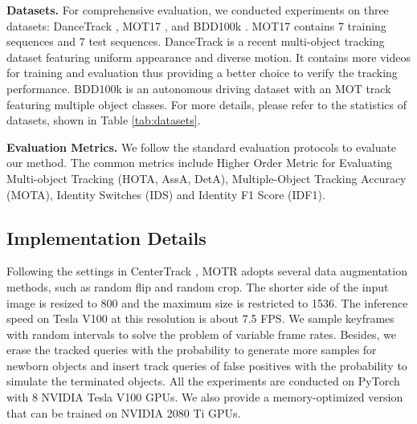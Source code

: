 \documentclass[runningheads]{llncs}
\begin{document}
\noindent \textbf{Datasets.}
For comprehensive evaluation, we conducted experiments on three datasets: DanceTrack \cite{peize2021dance}, MOT17 \cite{milan2016mot16}, and BDD100k \cite{bdd100k}.
MOT17 \cite{milan2016mot16} contains 7 training sequences and 7 test sequences.
DanceTrack \cite{peize2021dance} is a recent multi-object tracking dataset featuring uniform appearance and diverse motion. It contains more videos for training and evaluation thus providing a better choice to verify the tracking performance.
BDD100k \cite{bdd100k} is an autonomous driving dataset with an MOT track featuring multiple object classes.
For more details, please refer to the statistics of datasets, shown in Table \ref{tab:datasets}.

\noindent \textbf{Evaluation Metrics.}
We follow the standard evaluation protocols to evaluate our method.
The common metrics include Higher Order Metric for Evaluating Multi-object Tracking \cite{hota2021} (HOTA, AssA, DetA), Multiple-Object Tracking Accuracy (MOTA), Identity Switches (IDS) and Identity F1 Score (IDF1).

\subsection{Implementation Details}
Following the settings in CenterTrack \cite{zhou2020centertrack}, MOTR adopts several data augmentation methods, such as random flip and random crop. The shorter side of the input image is resized to 800 and the maximum size is restricted to 1536. The inference speed on Tesla V100 at this resolution is about 7.5 FPS. We sample keyframes with random intervals to solve the problem of variable frame rates. Besides, we erase the tracked queries with the probability  to generate more samples for newborn objects and insert track queries of false positives with the probability  to simulate the terminated objects.
All the experiments are conducted on PyTorch with 8 NVIDIA Tesla V100 GPUs. We also provide a memory-optimized version that can be trained on NVIDIA 2080 Ti GPUs.
\end{document}
